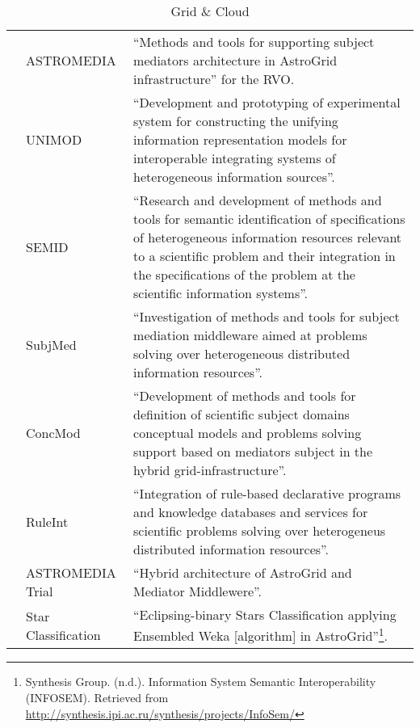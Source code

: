 \begin{table*}[h!t]
\begin{tabular}{|l|p{3cm}|p{12.5cm}|}
			& ASTROMEDIA & ``Methods and tools for supporting subject mediators architecture in AstroGrid infrastructure'' for the RVO.\\
			& UNIMOD & ``Development and prototyping of experimental system for constructing the unifying information representation models for 
								interoperable integrating systems of heterogeneous information sources''.\\
			& SEMID & ``Research and development of methods and tools for semantic identification of specifications of heterogeneous information resources 
								relevant to a scientific problem and their integration in the specifications of the problem at the scientific information 
								systems''.\\
			& SubjMed & ``Investigation of methods and tools for subject mediation middleware aimed at problems solving over heterogeneous distributed 
								information resources''.\\
			& ConcMod & ``Development of methods and tools for definition of scientific subject domains conceptual models and problems solving support based 
								on mediators subject in the hybrid grid-infrastructure''.\\
			& RuleInt & ``Integration of rule-based declarative programs and knowledge databases and services for scientific problems solving over 
								heterogeneus distributed information resources''. \\
			& ASTROMEDIA Trial & ``Hybrid architecture of AstroGrid and Mediator Middlewere''. \\
			& Star Classification & ``Eclipsing-binary Stars Classification applying Ensembled Weka [algorithm] in AstroGrid''\footnote{Synthesis Group. 
								(n.d.). Information System Semantic Interoperability (INFOSEM). Retrieved from 
								\url{http://synthesis.ipi.ac.ru/synthesis/projects/InfoSem/}}.\\
	\hline
	\end{tabular}
	\caption{Grid \& Cloud}
	\label{table:gc}
\end{table*}



